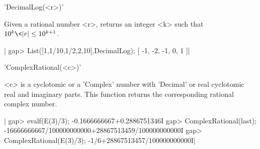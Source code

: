 
'DecimalLog(<r>)'

Given  a rational number <r>, returns an  integer <k> such that $10^k\< |r|
\le 10^{k+1}$.

|    gap> List([1,1/10,1/2,2,10],DecimalLog);
    [ -1, -2, -1, 0, 1 ]|


'ComplexRational(<c>)'

<c> is a cyclotomic or a 'Complex' number with 'Decimal' or real cyclotomic
real  and imaginary parts. This function returns the corresponding rational
complex number.

|    gap> evalf(E(3)/3);
    -0.1666666667+0.2886751346I
    gap> ComplexRational(last);
    -16666666667/100000000000+28867513459/100000000000I
    gap> ComplexRational(E(3)/3);
    -1/6+28867513457/100000000000I|
